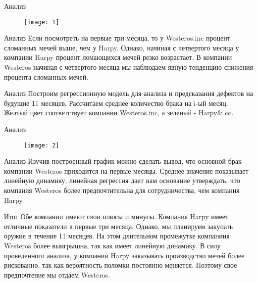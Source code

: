 \documentclass{beamer}
\begin{document}
\begin{frame}{Анализ}

\begin{figure}[t]
\centering
\texttt{[image: 1]}
\end{figure}

\end{frame}

\begin{frame}{Анализ}
Если посмотреть на первые три месяца, то у Westeros.inc процент сломанных мечей выше, чем у Harpy. Однако, начиная с четвертого месяца у компании Harpy процент ломающихся мечей резко возрастает. В компании Westeros начиная с четвертого месяца мы наблюдаем явную тенденцию снижения процента сломанных мечей. 
\end{frame}

\begin{frame}{Анализ}
Построим регрессионную модель для анализа и предсказания дефектов на будущие 11 месяцев. Рассчитаем среднее количество брака на i-ый месяц. Желтый цвет соответствует компании Westeros.inc, а зеленый - Harpy\& co.
\end{frame}

\begin{frame}{Анализ}

\begin{figure}[t]
\centering
\texttt{[image: 2]}
\end{figure}
\end{frame}

\begin{frame}{Анализ}
Изучив построенный график можно сделать вывод, что основной брак компании Westeros приходится на первые месяцы. Среднее значение показывает линейную динамику, линейная регрессия дает нам основание утверждать, что компания Westeros более предпочтительна для сотрудничества, чем компания Harpy.
\end{frame}

\begin{frame}{Итог}
Обе компании имеют свои плюсы и минусы. Компания Harpy имеет отличные показатели в первые три месяца. Однако, мы планируем закупать оружие в течение 11 месяцев. На этом длительном промежутке компаниия Westeros более выигрышна, так как имеет линейную динамику. В силу проведенного анализа, у компании Harpy заказывать производство мечей более рискованно, так как вероятность поломки постоянно меняется. Поэтому свое предпочтение мы отдаем Westeros.
\end{frame}
\end{document}
